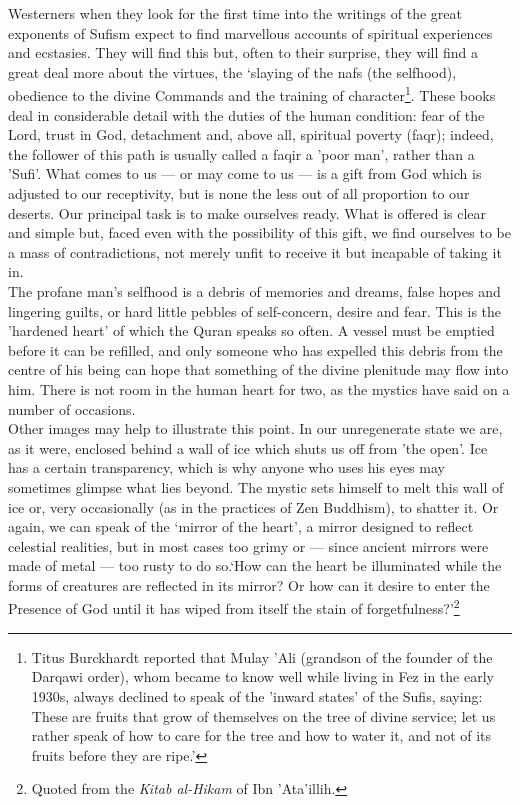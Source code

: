 \documentclass[10pt, twoside]{book}
\begin{document}
Westerners when they look for the first time into the writings of the great exponents of Sufism 
expect to find marvellous accounts of spiritual experiences and ecstasies. They will find this but, 
often to their surprise, they will find a great deal more about the virtues, the `slaying of the nafs 
(the selfhood), obedience to the divine Commands and the training of character\footnote{Titus Burckhardt reported that Mulay 'Ali (grandson of the founder of the Darqawi order), whom 
became to know well while living in Fez in the early 1930s, always declined to speak of the 'inward 
states' of the Sufis, saying: These are fruits that grow of themselves on the tree of divine service; 
let us rather speak of how to care for the tree and how to water it, and not of its fruits before 
they are ripe.' }. These books 
deal in considerable detail with the duties of the human condition: fear of the Lord, trust in God, 
detachment and, above all, spiritual poverty (faqr); indeed, the follower of this path is usually 
called a faqir a 'poor man', rather than a 'Sufi'. What comes to us --- or may come to us --- is a gift 
from God which is adjusted to our receptivity, but is none the less out of all proportion to our 
deserts. Our principal task is to make ourselves ready. What is offered is clear and simple but, 
faced even with the possibility of this gift, we find ourselves to be a mass of contradictions, not 
merely unfit to receive it but incapable of taking it in. \\

The profane man's selfhood is a debris of memories and dreams, false hopes and lingering guilts, or 
hard little pebbles of self\hyp{}concern, desire and fear. This is the 'hardened heart' of which the Quran 
speaks so often. A vessel must be emptied before it can be refilled, and only someone who has 
expelled this debris from the centre of his being can hope that something of the divine plenitude may 
flow into him. There is not room in the human heart for two, as the mystics have said on a number of 
occasions. \\

Other images may help to illustrate this point. In our unregenerate state we are, as it were, 
enclosed behind a wall of ice which shuts us off from 'the open'. Ice has a certain transparency, 
which is why anyone who uses his eyes may sometimes glimpse what lies beyond. The mystic sets himself 
to melt this wall of ice or, very occasionally (as in the practices of Zen Buddhism), to shatter it. 
Or again, we can speak of the `mirror of the heart', a mirror designed to reflect celestial 
realities, but in most cases too grimy or --- since ancient mirrors were made of metal --- too rusty to 
do so.`How can the heart be illuminated while the forms of creatures are reflected in its mirror? Or how can it desire to enter the Presence of God until it has wiped from itself the stain of 
forgetfulness?'\footnote{Quoted from the \emph{Kitab al\hyp{}Hikam} of Ibn 'Ata'illih.}\\
\end{document}
